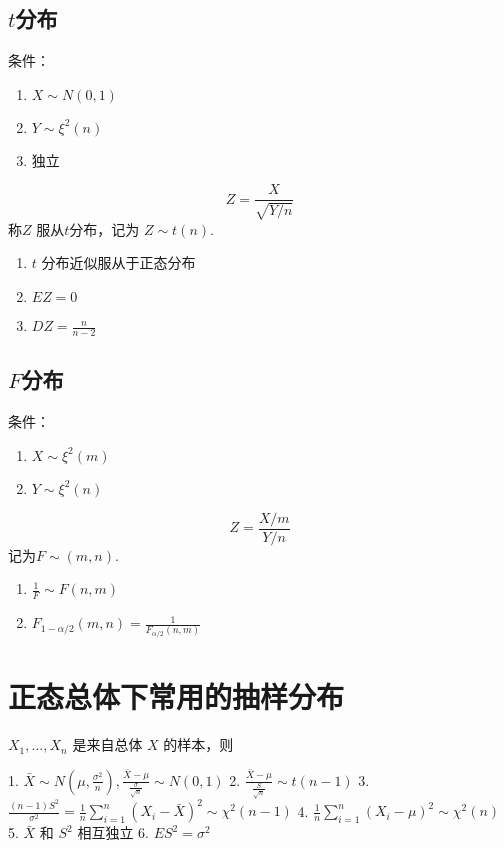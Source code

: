 \subsection{$t$分布}
\label{sub:_t_分布}

\begin{definition}
    条件：
    \begin{enumerate}
        \item $X \sim N(0,1)$
        \item $Y \sim \xi^2(n)$
        \item 独立
    \end{enumerate}
    \[
        Z = \frac{X}{\sqrt{Y/n}}
    \]
    称$Z$ 服从$t$分布，记为 $Z \sim t(n).$
\end{definition}

\begin{theorem}
    \begin{enumerate}
        \item $t$ 分布近似服从于正态分布
        \item $EZ = 0$
        \item $DZ = \frac{n}{n-2}$
    \end{enumerate}
\end{theorem}

\subsection{$F$分布}
\label{sub:_f_分布}

\begin{definition}
    条件：
    \begin{enumerate}
        \item $X \sim \xi^2(m)$
        \item $Y \sim \xi^2(n)$
    \end{enumerate}
    \[
        Z = \frac{X/m}{Y/n}
    \]
    记为$F \sim (m,n).$
\end{definition}

\begin{theorem}
    \begin{enumerate}
        \item $\frac{1}{F} \sim F(n,m)$
        \item $F_{1-\alpha/2}(m,n)= \frac{1}{F_{\alpha/2}(n,m)}$
    \end{enumerate}
\end{theorem}

\section{正态总体下常用的抽样分布}
\label{sec:正态总体下常用的抽样分布}

$X_1, \ldots, X_n$ 是来自总体 $X$ 的样本，则

1. $ \bar{X} \sim N(\mu, \frac{\sigma^2}{n}), \frac{\bar{X}-\mu}{\frac{\sigma}{\sqrt{n}}} \sim N(0, 1) $
2. $\frac{ \bar{X} - \mu}{\frac{S}{\sqrt{n}}} \sim t(n-1)$
3. $\frac{(n-1)S^2}{\sigma^2} = \frac{1}{n} \sum_{i=1}^n (X_i-\bar{X})^2 \sim \chi^2(n-1)$
4. $\frac{1}{n} \sum_{i=1}^n (X_i-\mu)^2 \sim \chi^2(n)$
5. $\bar{X}$ 和 $S^2$ 相互独立
6. $ES^2 = \sigma^2$



